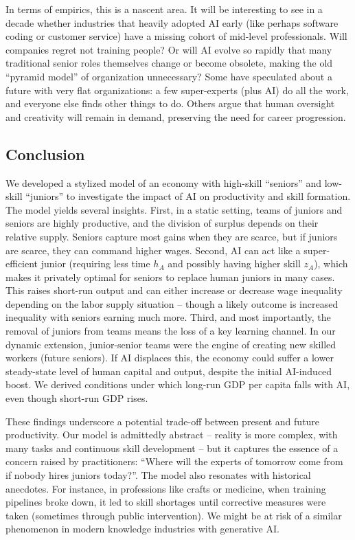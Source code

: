 \documentclass[12pt]{article}
\begin{document}
{In terms of {empirics}, this is a nascent area. It will be
interesting to see in a decade whether industries that heavily adopted
AI early (like perhaps software coding or customer service) have a
missing cohort of mid-level professionals. Will companies regret not
training people? Or will AI evolve so rapidly that many traditional
senior roles themselves change or become obsolete, making the old
``pyramid model'' of organization unnecessary? Some have speculated
about a future with {very flat organizations}: a few
super-experts (plus AI) do all the work, and everyone else finds other
things to do. Others argue that human oversight and creativity will
remain in demand, preserving the need for career progression.

\subsection{Conclusion}\label{conclusion}

We developed a stylized model of an economy with high-skill ``seniors''
and low-skill ``juniors'' to investigate the impact of AI on
productivity and skill formation. The model yields several insights.
{First}, in a static setting, teams of juniors and seniors are
highly productive, and the division of surplus depends on their relative
supply. Seniors capture most gains when they are scarce, but if juniors
are scarce, they can command higher wages. {Second}, AI can act
like a super-efficient junior (requiring less time \(h_A\) and possibly
having higher skill \(z_A\)), which makes it privately optimal for
seniors to replace human juniors in many cases. This raises short-run
output and can either increase or decrease wage inequality depending on
the labor supply situation -- though a likely outcome is increased
inequality with seniors earning much more. {Third}, and most
importantly, the removal of juniors from teams means the {loss of
a key learning channel}. In our dynamic extension, junior-senior teams
were the engine of creating new skilled workers (future seniors). If AI
displaces this, the economy could suffer a {lower steady-state
level of human capital and output}, despite the initial AI-induced
boost. We derived conditions under which long-run GDP per capita falls
with AI, even though short-run GDP rises.

These findings underscore a potential {trade-off between present
and future productivity}. Our model is admittedly abstract -- reality is
more complex, with many tasks and continuous skill development -- but it
captures the essence of a concern raised by practitioners: {``Where
will the experts of tomorrow come from if nobody hires juniors
today?''}. The model also resonates with historical anecdotes. For
instance, in professions like crafts or medicine, when training
pipelines broke down, it led to skill shortages until corrective
measures were taken (sometimes through public intervention). We might be
at risk of a similar phenomenon in modern knowledge industries with
generative AI.

}
\end{document}
